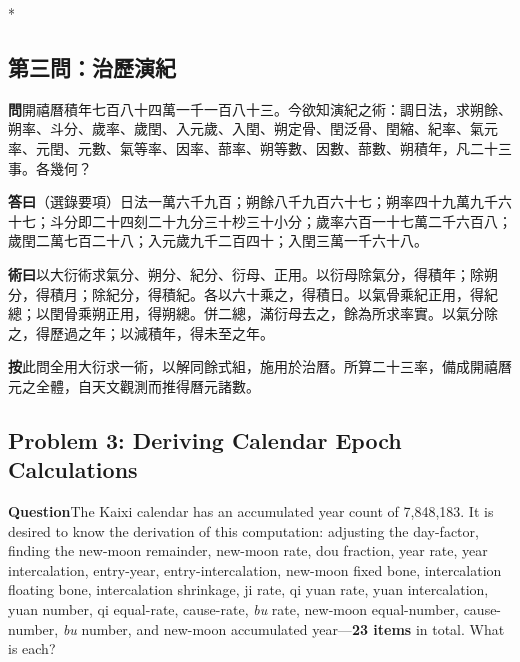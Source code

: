 \documentclass[11pt,a4paper]{article}
\newcommand{\WenCN}{\textbf{\color{headcolor}問}}
\newcommand{\DaCN}{\textbf{\color{headcolor}答曰}}
\newcommand{\ShuCN}{\textbf{\color{headcolor}術曰}}
\newcommand{\AnCN}{\textbf{\color{headcolor}按}}
\newcommand{\WenEN}{\textbf{\color{headcolor}Question}}
\begin{document}
\newpage

\switchcolumn[0]*
\subsection*{第三問：治歷演紀}

\vspace{0.5em}
\WenCN{}\quad 開禧曆積年七百八十四萬一千一百八十三。今欲知演紀之術：調日法，求朔餘、朔率、斗分、歲率、歲閏、入元歲、入閏、朔定骨、閏泛骨、閏縮、紀率、氣元率、元閏、元數、氣等率、因率、蔀率、朔等數、因數、蔀數、朔積年，凡二十三事。各幾何？

\vspace{0.5em}
\DaCN{}\quad（選錄要項）日法一萬六千九百；朔餘八千九百六十七；朔率四十九萬九千六十七；斗分即二十四刻二十九分三十杪三十小分；歲率六百一十七萬二千六百八；歲閏二萬七百二十八；入元歲九千二百四十；入閏三萬一千六十八。

\vspace{0.5em}
\ShuCN{}\quad 以大衍術求氣分、朔分、紀分、衍母、正用。以衍母除氣分，得積年；除朔分，得積月；除紀分，得積紀。各以六十乘之，得積日。以氣骨乘紀正用，得紀總；以閏骨乘朔正用，得朔總。併二總，滿衍母去之，餘為所求率實。以氣分除之，得歷過之年；以減積年，得未至之年。

\vspace{0.5em}
\AnCN{}\quad 此問全用大衍求一術，以解同餘式組，施用於治曆。所算二十三率，備成開禧曆元之全體，自天文觀測而推得曆元諸數。

\switchcolumn[1]
\subsection*{Problem 3: Deriving Calendar Epoch Calculations}
\label{sec:zhiliyanji}

\vspace{0.5em}
\WenEN{}\quad The Kaixi calendar has an accumulated year count of 7,848,183. It is desired to know the derivation of this computation: adjusting the day-factor, finding the new-moon remainder, new-moon rate, dou fraction, year rate, year intercalation, entry-year, entry-intercalation, new-moon fixed bone, intercalation floating bone, intercalation shrinkage, ji rate, qi yuan rate, yuan intercalation, yuan number, qi equal-rate, cause-rate, \textit{bu} rate, new-moon equal-number, cause-number, \textit{bu} number, and new-moon accumulated year---\textbf{23 items} in total. What is each?
\end{document}
